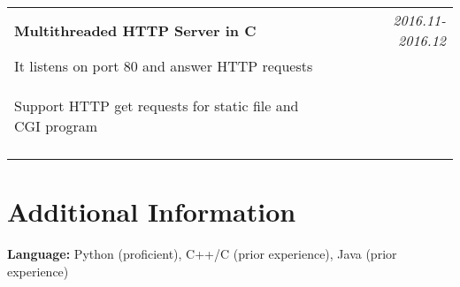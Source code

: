 \documentclass[a4paper,10pt]{article}
\begin{document}
\begin{tabular}{p{13.5cm}p{0.5cm}r}
\textbf{Multithreaded HTTP Server in C} && \emph{2016.11-2016.12} \\
\hspace{1em} It listens on port 80 and answer HTTP requests && \vspace{-0.5em} \\
\begin{compactitem}
  \item Support HTTP get requests for static file and CGI program\vspace{0.2em}
\end{compactitem}&&\vspace{-2.2em} \\
\multicolumn{3}{c}{} \\

\end{tabular}


\section{Additional Information}
\begin{flushleft}
\hspace{1em} \textbf{Language:} Python (proficient), C++/C (prior experience), Java (prior experience) \\
\end{flushleft}

\end{document}
